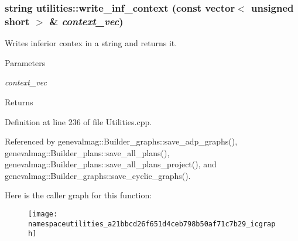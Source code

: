\hypertarget{namespaceutilities_a21bbcd26f651d4ceb798b50af71c7b29}{
\subsubsection[{write\_\-inf\_\-context}]{\setlength{\rightskip}{0pt plus 5cm}string utilities::write\_\-inf\_\-context (const vector$<$ unsigned short $>$ \& {\em context\_\-vec})}}
\label{namespaceutilities_a21bbcd26f651d4ceb798b50af71c7b29}
Writes inferior contex in a string and returns it. 
\begin{DoxyParams}{Parameters}
\item[{\em context\_\-vec}]\end{DoxyParams}
\begin{DoxyReturn}{Returns}

\end{DoxyReturn}


Definition at line 236 of file Utilities.cpp.



Referenced by genevalmag::Builder\_\-graphs::save\_\-adp\_\-graphs(), genevalmag::Builder\_\-plans::save\_\-all\_\-plans(), genevalmag::Builder\_\-plans::save\_\-all\_\-plans\_\-project(), and genevalmag::Builder\_\-graphs::save\_\-cyclic\_\-graphs().



Here is the caller graph for this function:\nopagebreak
\begin{figure}[H]
\begin{center}
\leavevmode
\texttt{[image: namespaceutilities\_a21bbcd26f651d4ceb798b50af71c7b29\_icgraph]}
\end{center}
\end{figure}


